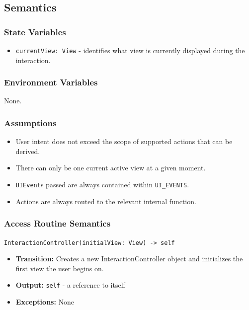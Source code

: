 \documentclass[12pt, titlepage]{article}
\begin{document}
\subsection{Semantics}

\subsubsection{State Variables}
\begin{itemize}
  \item \texttt{currentView: View} - identifies what view is currently displayed during the interaction.
\end{itemize}

\subsubsection{Environment Variables}
None. 

\subsubsection{Assumptions}
\begin{itemize}
  \item User intent does not exceed the scope of supported actions that can be derived.
  \item There can only be one current active view at a given moment.
  \item \texttt{UIEvent}s passed are always contained within \texttt{UI\_EVENTS}.
  \item Actions are always routed to the relevant internal function.
\end{itemize}

\subsubsection{Access Routine Semantics}
\texttt{InteractionController(initialView: View) -> self}
\begin{itemize}
  \item \textbf{Transition:} Creates a new InteractionController object and initializes the first view the user begins on.
  \item \textbf{Output:} \texttt{self} - a reference to itself
  \item \textbf{Exceptions:} None
\end{itemize}
\end{document}
